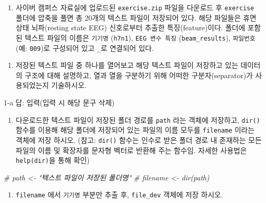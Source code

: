\documentclass[
  11pt,
]{krantz}
\makeatletter
\newenvironment{Shaded}{\begin{snugshade}}{\end{snugshade}}
\newcommand{\CommentTok}[1]{\textcolor[rgb]{0.37,0.37,0.37}{\textit{#1}}}
\providecommand{\tightlist}{%
  \setlength{\itemsep}{0pt}\setlength{\parskip}{0pt}}
\newenvironment{kframe}{%
\medskip{}
\setlength{\fboxsep}{.8em}
 \def\at@end@of@kframe{}%
 \ifinner\ifhmode%
  \def\at@end@of@kframe{\end{minipage}}%
  \begin{minipage}{\columnwidth}%
 \fi\fi%
 \def\FrameCommand##1{\hskip\@totalleftmargin \hskip-\fboxsep
 \colorbox{shadecolor}{##1}\hskip-\fboxsep
     \hskip-\linewidth \hskip-\@totalleftmargin \hskip\columnwidth}%
 \MakeFramed {\advance\hsize-\width
   \@totalleftmargin\z@ \linewidth\hsize
   \@setminipage}}%
 {\par\unskip\endMakeFramed%
 \at@end@of@kframe}
\renewenvironment{quote}{\begin{kframe}}{\end{kframe}}
\makeatother
\begin{document}
\begin{enumerate}
\def\labelenumi{\arabic{enumi}.}
\tightlist
\item
  사이버 캠퍼스 자료실에 업로드된 \texttt{exercise.zip} 파일을 다운로드 후 \texttt{exercise} 폴더에 압축을 풀면 총 20개의 텍스트 파일이 저장되어 있다. 해당 파일들은 휴면상태 뇌파(resting state EEG) 신호로부터 추출한 특징(feature)이다. 폴더에 포함된 텍스트 파일의 이름은 \texttt{기기명} (\texttt{h7n1}), \texttt{EEG\ 변수\ 특징} (\texttt{beam\_results}), \texttt{파일번호} (예: \texttt{009})로 구성되어 있고 \texttt{\_}로 연결되어 있다.
\end{enumerate}

\begin{enumerate}
\def\labelenumi{\alph{enumi}.}
\tightlist
\item
  저장된 텍스트 파일 중 하나를 열어보고 해당 텍스트 파일이 저장하고 있는 데이터의 구조에 대해 설명하고, 열과 열을 구분하기 위해 어떠한 구분자(separator)가 사용되었는지 기술하시오.
\end{enumerate}

\begin{quote}
1-a 답: 입력(입력 시 해당 문구 삭제)
\end{quote}

\begin{enumerate}
\def\labelenumi{\alph{enumi}.}
\setcounter{enumi}{1}
\tightlist
\item
  다운로드한 텍스트 파일이 저장된 폴더 경로를 \texttt{path} 라는 객체에 저장하고, \texttt{dir()} 함수를 이용해 해당 폴더에 저장되어 있는 파일의 이름 모두를 \texttt{filename} 이라는 객체에 저장 하시오. (참고: \texttt{dir()} 함수는 인수로 받은 폴더 경로 내 존재하는 모든 파일의 이름 및 확장자를 문자형 벡터로 반환해 주는 함수임. 자세한 사용법은 \texttt{help(dir)}을 통해 확인)
\end{enumerate}

\footnotesize

\begin{Shaded}
\begin{Highlighting}[]
\CommentTok{# path <- "텍스트 파일이 저장된 폴더명"}
\CommentTok{# filename <- dir(path)}
\end{Highlighting}
\end{Shaded}

\normalsize

\begin{enumerate}
\def\labelenumi{\alph{enumi}.}
\setcounter{enumi}{2}
\tightlist
\item
  \texttt{filename} 에서 \texttt{기기명} 부분만 추출 후, \texttt{file\_dev} 객체에 저장 하시오.
\end{enumerate}
\end{document}
